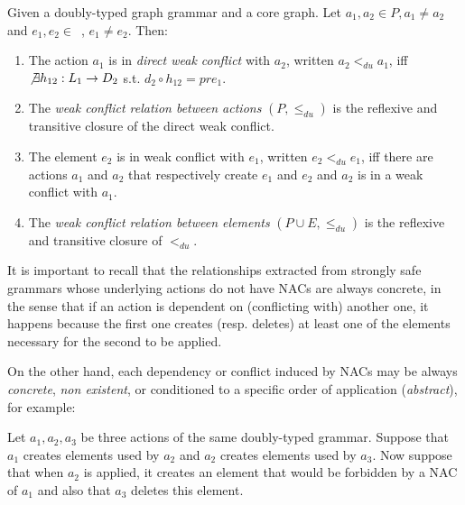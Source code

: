 \begin{definition} Given \doublyTypedGraphGrammarCore{} a doubly-typed graph grammar and \coreGraph{} a core graph. Let $a_1, a_2 \in P, a_1 \ne a_2$ and \mbox{$e_1, e_2 \in $ \coreGraph{},} $e_1 \ne e_2$. Then: 

  \begin{enumerate}
    \item The action $a_1$ is in \emph{direct weak conflict} with $a_2$, written $a_2 <_{du} a_1$, iff \mbox{$\not\exists h_{12} : L_1 \rightarrow D_2$} s.t. \mbox{$d_2 \circ h_{12} = pre_1$}.

   \item The \emph{weak conflict relation between actions} $(P,\leq_{du})$ is the reflexive and transitive closure of the direct weak conflict.
   \item The element $e_2$ is in weak conflict with $e_1$, written $e_2 <_{du} e_1$, iff there are actions $a_1$ and $a_2$ that respectively create $e_1$ and $e_2$ and $a_2$ is in a weak conflict with $a_1$.
   \item The \emph{weak conflict relation between elements} $(P \cup E, \leq_{du})$ is the reflexive and transitive closure of $<_{du}$.
  \end{enumerate}
\end{definition}

It is important to recall that the relationships extracted from strongly safe grammars whose underlying actions do not have NACs are always concrete, in the sense that if an action is dependent on (conflicting with) another one, it happens because the first one creates (resp. deletes) at least one of the elements necessary for the second to be applied.

On the other hand, each dependency or conflict induced by NACs may be always \emph{concrete}, \emph{non existent}, or conditioned to a specific order of application (\emph{abstract}), for example: 

Let $a_1, a_2, a_3$ be three actions of the same doubly-typed grammar. Suppose that $a_1$ creates elements used by $a_2$ and $a_2$ creates elements used by $a_3$. 
Now suppose that when $a_2$ is applied, it creates an element that would be forbidden by a NAC of $a_1$ and also that $a_3$ deletes this element. 

